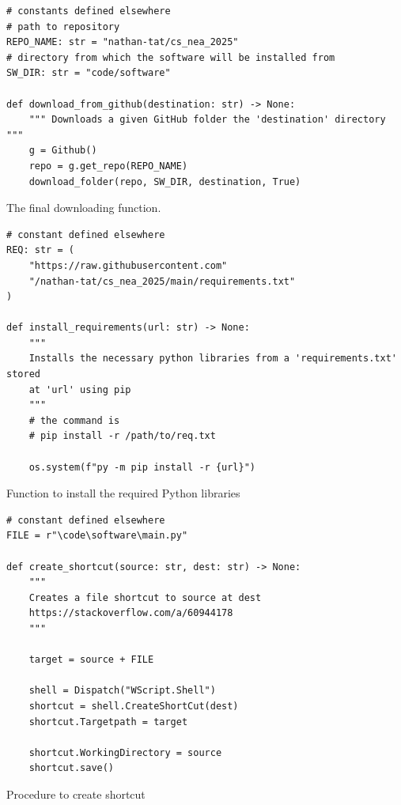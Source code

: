 \documentclass[11pt]{article}
\begin{document}
        \newpage
        \begin{listing}[!ht]
            \begin{verbatim}
# constants defined elsewhere
# path to repository
REPO_NAME: str = "nathan-tat/cs_nea_2025"
# directory from which the software will be installed from 
SW_DIR: str = "code/software"

def download_from_github(destination: str) -> None:
    """ Downloads a given GitHub folder the 'destination' directory """
    g = Github()
    repo = g.get_repo(REPO_NAME)
    download_folder(repo, SW_DIR, destination, True)
            \end{verbatim}
            \caption{The final downloading function.}
            \label{sc:final_dl_func_c1}
        \end{listing}


        \newpage
        \begin{listing}[!ht]
            \begin{verbatim}
# constant defined elsewhere
REQ: str = (
    "https://raw.githubusercontent.com"
    "/nathan-tat/cs_nea_2025/main/requirements.txt"
)

def install_requirements(url: str) -> None:
    """ 
    Installs the necessary python libraries from a 'requirements.txt' stored  
    at 'url' using pip
    """
    # the command is 
    # pip install -r /path/to/req.txt
    
    os.system(f"py -m pip install -r {url}")
            \end{verbatim}
            \caption{Function to install the required Python libraries}
            \label{sc:install_reqs_fail1_c1}
        \end{listing}


        \newpage
        \begin{listing}[!h]
            \begin{verbatim}
# constant defined elsewhere
FILE = r"\code\software\main.py"

def create_shortcut(source: str, dest: str) -> None:
    """ 
    Creates a file shortcut to source at dest 
    https://stackoverflow.com/a/60944178
    """
    
    target = source + FILE
    
    shell = Dispatch("WScript.Shell")    
    shortcut = shell.CreateShortCut(dest)
    shortcut.Targetpath = target
    
    shortcut.WorkingDirectory = source
    shortcut.save()
            \end{verbatim}
            \caption{Procedure to create shortcut}
            \label{sc:create_shortcut_c1}
        \end{listing}
\end{document}
